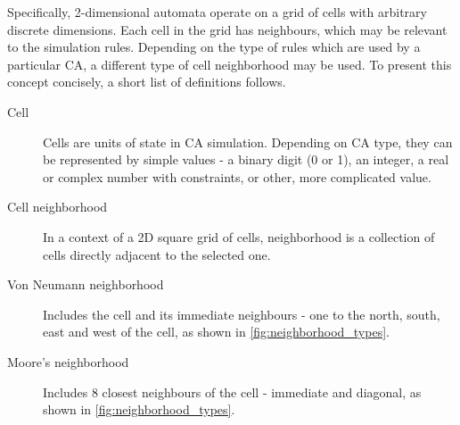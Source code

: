 \documentclass[12pt]{report}
\begin{document}
Specifically, 2-dimensional automata operate on a grid of cells with arbitrary discrete dimensions. Each cell in the grid has neighbours, which may be relevant to the simulation rules. Depending on the type of rules which are used by a particular CA, a different type of cell neighborhood may be used. To present this concept concisely, a short list of definitions follows.

\begin{description}
	\item[Cell] Cells are units of state in CA simulation. Depending on CA type, they can be represented by simple values - a binary digit (0 or 1), an integer, a real or complex number with constraints, or other, more complicated value.  
	\item[Cell neighborhood] In a context of a 2D square grid of cells, neighborhood is a collection of cells directly adjacent to the selected one.
	\item[Von Neumann neighborhood] Includes the cell and its immediate neighbours - one to the north, south, east and west of the cell, as shown in  \cref{fig:neighborhood_types}.
	\item[Moore's neighborhood] Includes 8 closest neighbours of the cell - immediate and diagonal, as shown in  \cref{fig:neighborhood_types}.
\end{description}
 
\end{document}
